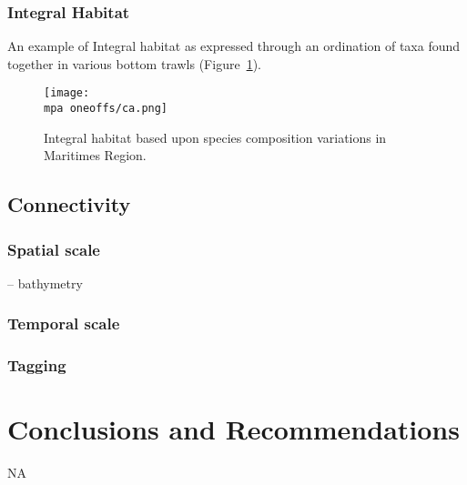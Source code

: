 \documentclass[letterpaper,portrait,11pt]{scrartcl}
\numberwithin{equation}{section}		%
\numberwithin{figure}{section}		%
\numberwithin{table}{section}				%
\newcommand{\ecomod}{\string~/ecomod_data/}   %
\newcommand{\mpa}{\ecomod/mpa/}       %
\begin{document}
\clearpage
\subsubsection{Integral Habitat}

An example of Integral habitat as expressed through an ordination of taxa found together in various bottom trawls (Figure~\ref{fig:speciesCompostionMap}).

\begin{figure}[h]
  \label{fig:speciesCompostionMap}
  \centering
  \texttt{[image: \\mpa oneoffs/ca.png]}
  \caption{Integral habitat based upon species composition variations in Maritimes Region.}
  
\end{figure}


\subsection{Connectivity}

\subsubsection{Spatial scale}

-- bathymetry

\subsubsection{Temporal scale}


\subsubsection{Tagging}



\section{Conclusions and Recommendations}

NA



\end{document}
